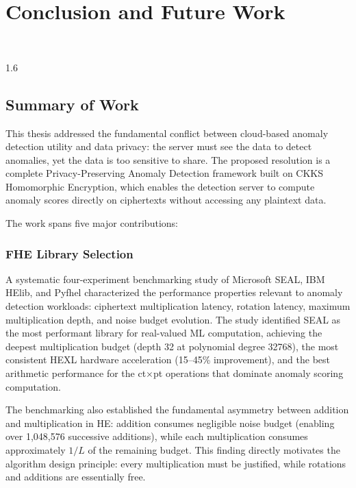 \chapter{Conclusion and Future Work}
\HRule\\[2cm]
\label{Chapter6}

\begin{spacing}{1.6}

\section{Summary of Work}

This thesis addressed the fundamental conflict between cloud-based anomaly
detection utility and data privacy: the server must see the data to detect
anomalies, yet the data is too sensitive to share. The proposed resolution is
a complete Privacy-Preserving Anomaly Detection framework built on CKKS
Homomorphic Encryption, which enables the detection server to compute anomaly
scores directly on ciphertexts without accessing any plaintext data.

The work spans five major contributions:

\subsection{FHE Library Selection}

A systematic four-experiment benchmarking study of Microsoft SEAL, IBM HElib,
and Pyfhel characterized the performance properties relevant to anomaly
detection workloads: ciphertext multiplication latency, rotation latency,
maximum multiplication depth, and noise budget evolution. The study identified
SEAL as the most performant library for real-valued ML computation, achieving
the deepest multiplication budget (depth 32 at polynomial degree 32768), the
most consistent HEXL hardware acceleration (15--45\% improvement), and the
best arithmetic performance for the ct$\times$pt operations that dominate
anomaly scoring computation.

The benchmarking also established the fundamental asymmetry between addition
and multiplication in HE: addition consumes negligible noise budget (enabling
over 1,048,576 successive additions), while each multiplication consumes
approximately $1/L$ of the remaining budget. This finding directly motivates
the algorithm design principle: every multiplication must be justified, while
rotations and additions are essentially free.


\end{spacing}
